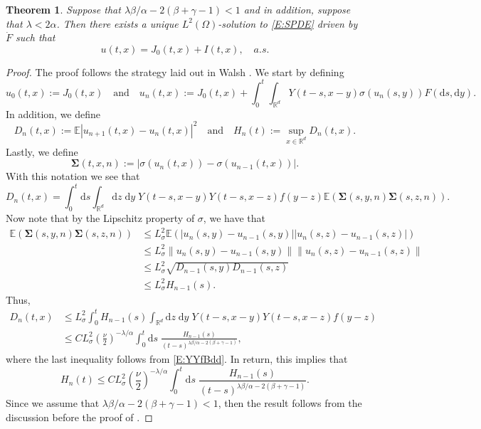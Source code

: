 \documentclass[a4paper,11pt]{article}
\numberwithin{equation}{section}
\theoremstyle{plain}
\newtheorem{theorem}{Theorem}[section]
\theoremstyle{definition}
\newcommand{\ud}{\ensuremath{\mathrm{d} }}
\newcommand{\Norm}[1]{\left\|  #1   \right\|}
\newcommand{\R}{\mathbb{R}}
\numberwithin{NQ}{section}
\numberwithin{LQ}{section}
\numberwithin{ZQ}{section}
\begin{document}
	\begin{theorem}
		\label{T:ExisAndUniq}
		Suppose that $\lambda \beta / \alpha - 2(\beta + \gamma -1) < 1$ and in addition, suppose that $\lambda < 2 \alpha$. Then there exists a unique $L^2(\Omega)$-solution to \eqref{E:SPDE} driven by $\dot{F}$ such that 
		\[
		u(t,x) = J_0(t,x) + I(t,x), \quad a.s.
		\]
	\end{theorem} 
	\begin{proof}
		The proof follows the strategy laid out in Walsh \cite{Walsh89}. We start by defining 
		\[
		u_0(t,x) := J_0(t,x) \quad \text{and} \quad u_n(t,x) := J_0(t,x) + \int_0^t \int_{\R^d} Y(t-s,x-y) \sigma(u_n(s,y)) F(\ud s, \ud y). 
		\]
		In addition, we define 
		\[
		D_n(t,x) := \mathbb{E}\left| u_{n+1}(t,x) - u_n(t,x) \right|^2 \quad \text{and} \quad H_n(t) := \sup_{x \in \R^d} D_n(t,x).
		\]
		Lastly, we define 
		\[
		\mathbf{\Sigma} (t,x,n) := | \sigma( u_n(t,x) ) - \sigma(u_{n-1} (t,x) ) |.
		\]
		With this notation we see that 
		\[
		D_n(t,x) = \int_0^t \ud s \int_{\R^d} \ud z \; \ud y \; Y(t-s,x-y) Y(t-s,x-z) f(y-z) \mathbb{E}\left(\mathbf{\Sigma}(s,y,n) \mathbf{\Sigma}(s,z,n)\right).
		\]
		Now note that by the Lipschitz property of $\sigma$, we have that  
		\begin{align*}
		\mathbb{E}\left(\mathbf{\Sigma}(s,y,n) \mathbf{\Sigma}(s,z,n)\right) &\le L^2_{\sigma} \mathbb{E} \left(|u_n(s,y)-u_{n-1}(s,y)||u_n(s,z)-u_{n-1}(s,z)|\right) \\
		& \le L^2_{\sigma} \Norm{ u_n(s,y)-u_{n-1}(s,y) } \Norm{u_n(s,z)-u_{n-1}(s,z)} \\ 
		& \le L^2_{\sigma} \sqrt{D_{n-1}(s,y) D_{n-1}(s,z)} \\
		& \le L^2_{\sigma} H_{n-1}(s).
		\end{align*}
		Thus, 
		\begin{align*}
		D_n(t,x) &\le L^2_{\sigma} \int_0^t H_{n-1}(s) \int_{\R^d} \ud z \; \ud y \; Y(t-s,x-y) Y(t-s,x-z) f(y-z) \\
		&\le C L^2_{\sigma} \left(\frac{\nu}{2}\right)^{-\lambda / \alpha} \int_0^t \ud s \; \frac{H_{n-1}(s)}{(t-s)^{\lambda \beta / \alpha - 2(\beta + \gamma -1)}},
		\end{align*}
		where the last inequality follows from \eqref{E:YYfBdd}. In return, this implies that 
		\[
		H_n(t) \le C L^2_{\sigma} \left(\frac{\nu}{2}\right)^{-\lambda / \alpha} \int_0^t \ud s \; \frac{H_{n-1}(s)}{(t-s)^{\lambda \beta / \alpha - 2(\beta + \gamma -1)}}.
		\]
		Since we assume that $\lambda \beta / \alpha - 2(\beta + \gamma -1) < 1$, then the result follows from the discussion before the proof of \cite[Lemma 3.3]{Walsh89}. 
	\end{proof}
	
\end{document}
